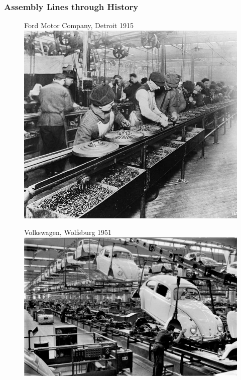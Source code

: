 \documentclass{beamer}
\begin{document}
\begin{frame}
\frametitle{Assembly Lines through History}
\begin{figure}
	\centering
	\begin{minipage}{0.47\textwidth}
		\centering
		Ford Motor Company, Detroit 1915\\[2mm]
		\includegraphics[width=\linewidth]{images/history-1.jpg}
	\end{minipage}
	\hspace{2mm}
	\begin{minipage}{0.45\textwidth}
		\centering
		Volkswagen, Wolfsburg 1951\\[2mm]
		\includegraphics[width=\linewidth]{images/history-5.jpg}
	\end{minipage}
\end{figure}
\end{frame}
\end{document}
